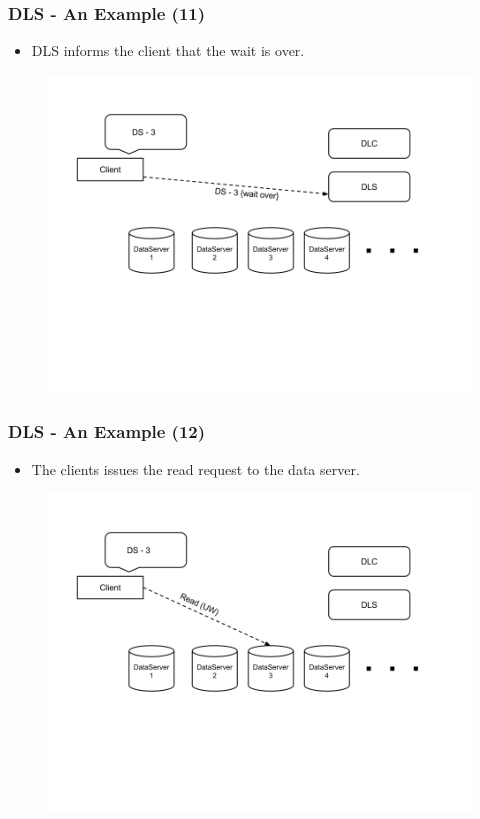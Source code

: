 \documentclass{beamer}
\begin{document}
\begin{frame}
  \frametitle{DLS - An Example (11)}
  \begin{itemize}
  \item DLS informs the client that the wait is over.
\newline
  \end{itemize}
  \begin{figure}
    \begin{center}
      \centerline{\includegraphics[scale=0.35]{img/DLS_Example10.png}}
    \end{center}
  \end{figure}
\end{frame}


\begin{frame}
  \frametitle{DLS - An Example (12)}
  \begin{itemize}
  \item The clients issues the read request to the data server.
\newline
  \end{itemize}
  \begin{figure}
    \begin{center}
      \centerline{\includegraphics[scale=0.35]{img/DLS_Example11.png}}
    \end{center}
  \end{figure}
\end{frame}
\end{document}
